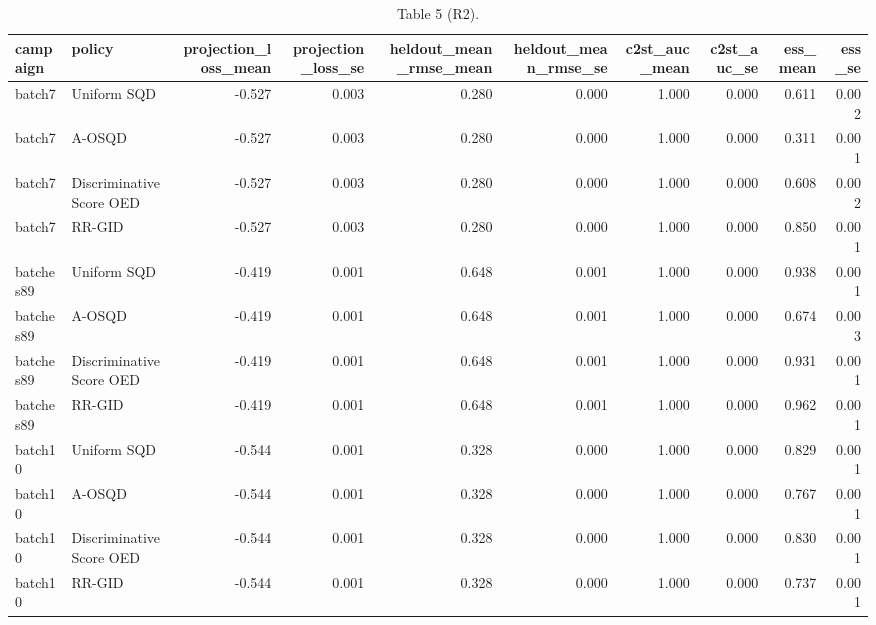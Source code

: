 \begin{table}[t]
\centering
\small
\caption{Table 5 (R2).}
\label{tab:Table_5_R2}
\begin{tabular}{llrrrrrrrr}
\toprule
campaign & policy & projection\_loss\_mean & projection\_loss\_se & heldout\_mean\_rmse\_mean & heldout\_mean\_rmse\_se & c2st\_auc\_mean & c2st\_auc\_se & ess\_mean & ess\_se \\
\midrule
batch7 & Uniform SQD & -0.527 & 0.003 & 0.280 & 0.000 & 1.000 & 0.000 & 0.611 & 0.002 \\
batch7 & A-OSQD & -0.527 & 0.003 & 0.280 & 0.000 & 1.000 & 0.000 & 0.311 & 0.001 \\
batch7 & Discriminative Score OED & -0.527 & 0.003 & 0.280 & 0.000 & 1.000 & 0.000 & 0.608 & 0.002 \\
batch7 & RR-GID & -0.527 & 0.003 & 0.280 & 0.000 & 1.000 & 0.000 & 0.850 & 0.001 \\
batches89 & Uniform SQD & -0.419 & 0.001 & 0.648 & 0.001 & 1.000 & 0.000 & 0.938 & 0.001 \\
batches89 & A-OSQD & -0.419 & 0.001 & 0.648 & 0.001 & 1.000 & 0.000 & 0.674 & 0.003 \\
batches89 & Discriminative Score OED & -0.419 & 0.001 & 0.648 & 0.001 & 1.000 & 0.000 & 0.931 & 0.001 \\
batches89 & RR-GID & -0.419 & 0.001 & 0.648 & 0.001 & 1.000 & 0.000 & 0.962 & 0.001 \\
batch10 & Uniform SQD & -0.544 & 0.001 & 0.328 & 0.000 & 1.000 & 0.000 & 0.829 & 0.001 \\
batch10 & A-OSQD & -0.544 & 0.001 & 0.328 & 0.000 & 1.000 & 0.000 & 0.767 & 0.001 \\
batch10 & Discriminative Score OED & -0.544 & 0.001 & 0.328 & 0.000 & 1.000 & 0.000 & 0.830 & 0.001 \\
batch10 & RR-GID & -0.544 & 0.001 & 0.328 & 0.000 & 1.000 & 0.000 & 0.737 & 0.001 \\
\bottomrule
\end{tabular}
\end{table}
